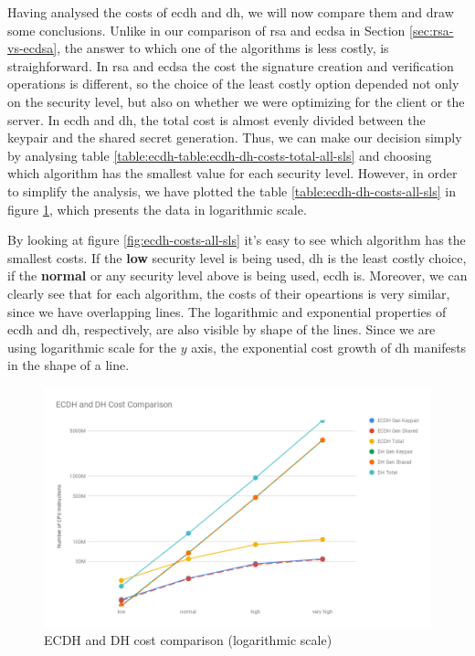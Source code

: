 \documentclass{llncs}
\begin{document}
Having analysed the costs of \gls{ecdh} and \gls{dh}, we will now compare them and draw some conclusions. Unlike in our comparison of
\gls{rsa} and \gls{ecdsa} in Section \ref{sec:rsa-vs-ecdsa}, the answer to which one of the algorithms is less costly, is straighforward.
In \gls{rsa} and \gls{ecdsa} the cost the signature creation and verification operations is different, so the choice of the least costly
option depended not only on the security level, but also on whether we were optimizing for the client or the server. In \gls{ecdh} and \gls{dh},
the total cost is almost evenly divided between the keypair and the shared secret generation. Thus, we can make our decision simply
by analysing table \ref{table:ecdh-table:ecdh-dh-costs-total-all-sls} and choosing which algorithm has the smallest value for each security level.
However, in order to simplify the analysis, we have plotted the table \ref{table:ecdh-dh-costs-all-sls} in figure \ref{fig:ecdh-dh-costs-all}, which
presents the data in logarithmic scale.

By looking at figure \ref{fig:ecdh-costs-all-sls} it's easy to see which algorithm has the smallest costs. If the \textbf{low} security level is being used, 
\gls{dh} is the least costly choice, if the \textbf{normal} or any security level above is being used, \gls{ecdh} is. Moreover, we can clearly see that
for each algorithm, the costs of their opeartions is very similar, since we have overlapping lines. The logarithmic and exponential properties of
\gls{ecdh} and \gls{dh}, respectively, are also visible by shape of the lines. Since we are using logarithmic scale for the $y$ axis, the
exponential cost growth of \gls{dh} manifests in the shape of a line.

\begin{figure}
  \centering
  \includegraphics[width=1.0\textwidth]{img/ecdh_dh_costs_all.png}
  \caption{\label{fig:ecdh-dh-costs-all} ECDH and DH cost comparison (logarithmic scale)}
\end{figure}
\end{document}
